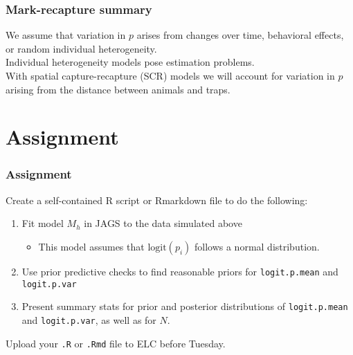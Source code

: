 \documentclass[color=usenames,dvipsnames]{beamer}\usepackage[]{graphicx}\usepackage[]{color}
\begin{document}


\begin{frame}
  \frametitle{Mark-recapture summary}
  We assume that variation in $p$ arises from changes over time,
  behavioral effects, or random individual heterogeneity. \\
  \pause \vfill
  Individual heterogeneity models pose estimation problems. \\
  \pause \vfill
  With spatial capture-recapture (SCR) models we will account for
  variation in $p$ arising from the distance between animals and
  traps. 
\end{frame}




\section{Assignment}




\begin{frame}[fragile]
  \frametitle{Assignment}
  Create a self-contained R script or Rmarkdown file to do the
  following: 
  \vfill
  \begin{enumerate}
    \item Fit model $M_h$ in JAGS to the data simulated above
      \begin{itemize}
        \item This model assumes that $\mathrm{logit}(p_i)$ follows a
          normal distribution. 
      \end{itemize}
    \item Use prior predictive checks to find reasonable priors for
      {\tt logit.p.mean} and {\tt logit.p.var}
    \item Present summary stats for prior and posterior distributions
      of {\tt logit.p.mean} and {\tt logit.p.var}, as well as for
      $N$. 
  \end{enumerate}
  \vfill
  Upload your {\tt .R} or {\tt .Rmd} file to ELC before Tuesday. 
\end{frame}
\end{document}
